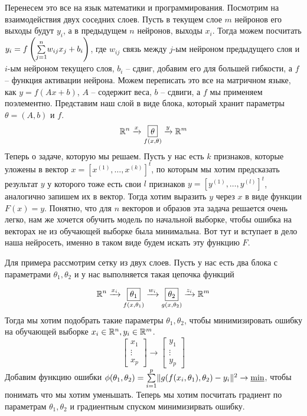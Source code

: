 \documentclass{article}
\begin{document}
Перенесем это все на язык математики и программирования. Посмотрим на взаимодействия двух соседних слоев. Пусть в текущем слое $m$ нейронов его выходы будут $y_i$, а в предыдущем $n$ нейронов, выходы $x_i$. Тогда можем посчитать $y_i = f\left(\Sum{j = 1}{n}w_{ij}x_j + b_i \right)$, где $w_{ij}$ связь между $j$-ым нейроном предыдущего слоя и $i$-ым нейроном текущего слоя, $b_i$ -- сдвиг, добавим его для большей гибкости, а $f$ -- функция активации нейрона. Можем переписать это все на матричном языке, как $y = f(Ax + b)$, $A$ -- содержит веса, $b$ -- сдвиги, а $f$ мы применяем поэлементно. Представим наш слой в виде блока, который хранит параметры $\theta = (A, b)$ и $f$.
$$
\R^n \xrightarrow[]{x} \underset{f(x, \theta)}{\boxed{\theta}} \xrightarrow[]{y} \R^m
$$
Теперь о задаче, которую мы решаем. Пусть у нас есть $k$ признаков, которые уложены в вектор $x = [x^{(1)}, \dots, x^{(k)}]^t$, по которым мы хотим предсказать результат $y$ у которого тоже есть свои $l$ признаков $y = [y^{(1)}, \dots, y^{(l)}]^t$, аналогично запишем их в вектор. Тогда хотим выразить $y$ через $x$ в виде функции $F(x) = y$. Понятно, что для $n$ векторов и образов эта задача решается очень легко, нам же хочется обучить модель по начальной выборке, чтобы ошибка на векторах не из обучающей выборке была минимальна. Вот тут и вступает в дело наша нейросеть, именно в таком виде будем искать эту функцию $F$.

Для примера рассмотрим сетку из двух слоев. Пусть у нас есть два блока с параметрами $\theta_1, \theta_2$ и у нас выполняется такая цепочка функций

$$
\R^n \xrightarrow[]{x_i} \underset{f(x, \theta_1)}{\boxed{\theta_1}} \xrightarrow[]{w_i} \underset{g(x, \theta_2)}{\boxed{\theta_2}} \xrightarrow[]{z_i} \R^m
$$
Тогда мы хотим подобрать такие параметры $\theta_1, \theta_2$, чтобы минимизировать ошибку на обучающей выборке $x_i \in \R^n, y_i \in \R^m$.
$$
\begin{bmatrix}
x_1\\
\vdots\\
x_p
\end{bmatrix}
\rightarrow
\begin{bmatrix}
y_1\\
\vdots\\
y_p
\end{bmatrix}
$$
Добавим функцию ошибки $\phi(\theta_1, \theta_2) = \Sum{i = 1}{p} \|g(f(x_i, \theta_1), \theta_2) - y_i\|^2 \rightarrow \underline{\min}$, чтобы понимать что мы хотим уменьшать. Теперь мы хотим посчитать градиент по параметрам $\theta_1, \theta_2$ и градиентным спуском минимизирвать ошибку.
\end{document}
